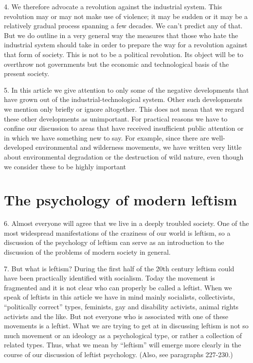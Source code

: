 \documentclass{article}
\begin{document}
4.  We therefore advocate a revolution against the industrial system.  This revolution may or may 
not make use of violence; it may be sudden or it may be a relatively gradual process spanning a 
few decades.  We can’t predict any of that.  But we do outline in a very general way the measures 
that those who hate the industrial system should take in order to prepare the way for a revolution 
against that form of society.  This is not to be a political revolution.  Its object will be to overthrow not governments but the economic and technological basis of the present society. \vspace{\baselineskip}

5.  In this article we give attention to only some of the negative developments that have grown out 
of  the  industrial-technological  system.   Other  such  developments  we  mention  only  briefly  or  
ignore altogether.  This does not mean that we regard these other developments as 
unimportant.  For practical reasons we have to confine our discussion to areas that have received 
insufficient public attention or in which we have something new to say.  For example, since there 
are well-developed environmental and wilderness movements, we have written very little about 
environmental degradation or the destruction of wild nature, even though we consider these to be 
highly important


\section{The psychology of modern leftism}

\hspace{0.5cm} 6.  Almost  everyone  will  agree  that  we  live  in  a  deeply  troubled  society.   One  of  the  most  
widespread  manifestations  of  the  craziness  of  our  world  is  leftism,  so  a  discussion  of  the  
psychology of leftism can serve as an introduction to the discussion of the problems of modern 
society in general. \vspace{\baselineskip}

7.  But what is leftism? During the first half of the 20th century leftism could have been practically 
identified with socialism.  Today the movement is fragmented and it is not clear who can properly 
be  called  a  leftist.   When  we  speak  of  leftists  in  this  article  we  have  in  mind  mainly  socialists,  
collectivists,  “politically  correct”  types,  feminists,  gay  and  disability  activists,  animal  rights  
activists  and  the  like.   But  not  everyone  who  is  associated  with  one  of  these  movements  is  a  
leftist.  What we are trying to get at in discussing leftism is not so much movement or an ideology 
as a psychological type, or rather a collection of related types.  Thus, what we mean by “leftism” 
will  emerge  more  clearly  in  the  course  of  our  discussion  of  leftist  psychology. (Also,  see  paragraphs 227-230.) \vspace{\baselineskip}
\end{document}
